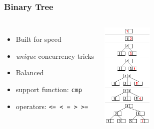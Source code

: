 \documentclass{beamer}
\begin{document}
\begin{frame}[fragile]
  \frametitle{Binary Tree}

  \vfill

\begin{columns}[c]

  \begin{itemize}
  \item Built for speed
  \item \textit{unique} concurrency tricks
  \item Balanced
  \item support function: \texttt{cmp}
  \item operators: \texttt{<= < = > >=}
  \end{itemize}

\begin{center}
  \includegraphics[height=14em]{B_tree_insertion_example.png}
\end{center}
\end{columns}
\end{frame}
\end{document}
